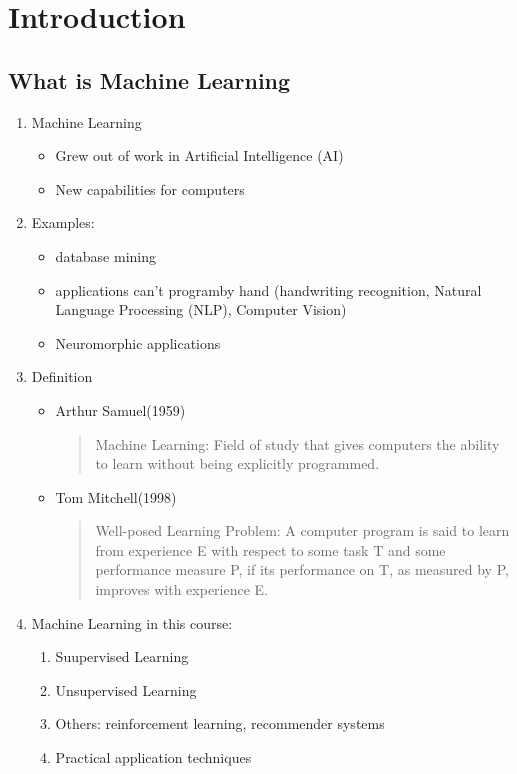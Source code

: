 \section{Introduction}
    \subsection{What is Machine Learning}
    
    \begin{enumerate}
        \item Machine Learning 
            \begin{itemize}
                \item Grew out of work in Artificial Intelligence (AI)
                \item New capabilities for computers
            \end{itemize}
        \item Examples: 
            \begin{itemize}
                \item database mining
                \item applications can't programby hand (handwriting recognition, Natural Language Processing (NLP), Computer Vision) 
                \item Neuromorphic applications
            \end{itemize}
           
        \item Definition
            \begin{itemize}
                \item Arthur Samuel(1959) \\
                    \begin{quote}
                        Machine Learning: Field of study that gives computers the ability to learn without being explicitly programmed.

                    \end{quote}
                \item Tom Mitchell(1998) \\
                    \begin{quote}
                         Well-posed Learning Problem: A computer program is said to learn from experience E with respect to some task T and some performance measure P, if its performance on T, as measured by P, improves with experience E. 

                    \end{quote}
           \end{itemize}
        \item Machine Learning in this course:
            \begin{enumerate}
                \item Suupervised Learning
                \item Unsupervised Learning
                \item Others: reinforcement learning, recommender systems
                \item Practical application techniques
            \end{enumerate}
    \end{enumerate}

